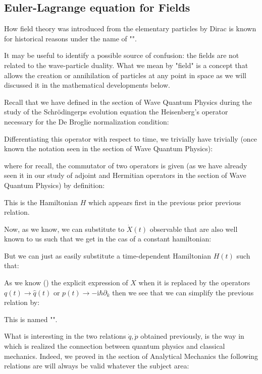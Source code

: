 	\pagebreak
	\subsection{Euler-Lagrange equation for Fields}
	How field theory was introduced from the elementary particles by Dirac is known for historical reasons under the name of "".

	It may be useful to identify a possible source of confusion: the fields are not related to the wave-particle duality. What we mean by "field" is a concept that allows the creation or annihilation of particles at any point in space as we will discussed it in the mathematical developments below.

	Recall that we have defined in the section of Wave Quantum Physics during the study of the Schrödingerps evolution equation the Heisenberg's operator necessary for the De Broglie normalization condition:
	
	Differentiating this operator with respect to time, we trivially have trivially (once known the notation seen in the section of Wave Quantum Physics):
	
	where for recall, the commutator of two operators is given (as we have already seen it in our study of adjoint and  Hermitian operators in the section of Wave Quantum Physics) by definition:
	
	This is the Hamiltonian $H$ which appears first in the previous prior previous relation.
	
	Now, as we know, we can substitute to $\dot{X}(t)$ observable that are also well known to us such that we get in the cas of a constant hamiltonian:
	
	But we can just as easily substitute a time-dependent Hamiltonian $H(t)$ such that:
	
	As we know () the explicit expression of $X$ when it is replaced by the operators $q(t)\rightarrow \hat{q}(t)$ or $p(t)\rightarrow -\mathrm{i}\hbar\partial_k$ then we see that we can simplify the previous relation by:
	
	This is named "". 
	
	What is interesting in the two relations $\dot{q},\dot{p}$ obtained previously, is the way in which is realized the connection between quantum physics and classical mechanics. Indeed, we proved in the section of Analytical Mechanics the following relations are will always be valid whatever the subject area:
	
